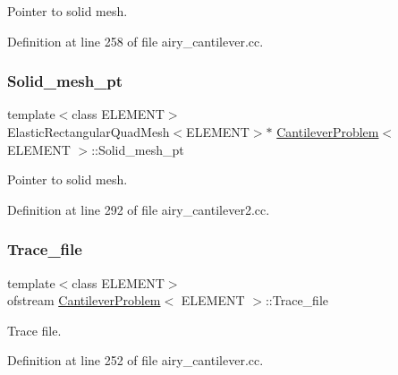 Pointer to solid mesh. 



Definition at line 258 of file airy\+\_\+cantilever.\+cc.

\mbox{\label{classCantileverProblem_af46dcd5eca58d44f1078e54f7779f0d5}} 
\subsubsection{\texorpdfstring{Solid\+\_\+mesh\+\_\+pt}{Solid\_mesh\_pt}\hspace{0.1cm}{\footnotesize\ttfamily [2/2]}}
{\footnotesize\ttfamily template$<$class E\+L\+E\+M\+E\+NT$>$ \\
Elastic\+Rectangular\+Quad\+Mesh$<$E\+L\+E\+M\+E\+NT$>$$\ast$ \hyperlink{classCantileverProblem}{Cantilever\+Problem}$<$ E\+L\+E\+M\+E\+NT $>$\+::Solid\+\_\+mesh\+\_\+pt\hspace{0.3cm}{\ttfamily [private]}}



Pointer to solid mesh. 



Definition at line 292 of file airy\+\_\+cantilever2.\+cc.

\mbox{\label{classCantileverProblem_af1e298e0b99bddc89b20da6ad4bb41e1}} 
\subsubsection{\texorpdfstring{Trace\+\_\+file}{Trace\_file}}
{\footnotesize\ttfamily template$<$class E\+L\+E\+M\+E\+NT$>$ \\
ofstream \hyperlink{classCantileverProblem}{Cantilever\+Problem}$<$ E\+L\+E\+M\+E\+NT $>$\+::Trace\+\_\+file\hspace{0.3cm}{\ttfamily [private]}}



Trace file. 



Definition at line 252 of file airy\+\_\+cantilever.\+cc.


